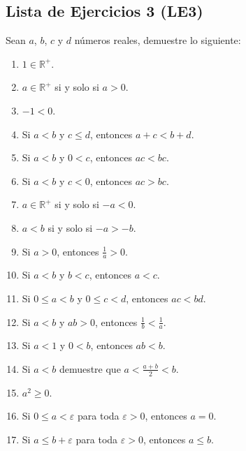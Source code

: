 \documentclass[11pt]{article}
\newcommand{\R}{\mathbb{R}}
\begin{document}
\subsection*{Lista de Ejercicios 3 (LE3)}
Sean $a$, $b$, $c$ y $d$ números reales, demuestre lo siguiente:%
%
\begin{enumerate}[label=\alph*)]
    \item $1 \in \R^+$.
    \item $a \in \R^+$ si y solo si $a>0$. %
    \item $-1<0$. %
    \item Si $a<b$ y $c \leq d$, entonces $a+c<b+d$. %
    \item Si $a<b$ y $0<c$, entonces $ac<bc$. %
    \item Si $a<b$ y $c<0$, entonces $ac>bc$. %
    \item $a \in \R^+$ si y solo si $-a<0$. %
    \item $a<b$ si y solo si $-a>-b$. %
    \item Si $a>0$, entonces $\frac{1}{a}>0$. %
    \item Si $a<b$ y $b<c$, entonces $a<c$. %
    \item Si $0 \leq a<b$ y $0 \leq c<d$, entonces $ac<bd$. %
    \item Si $a<b$ y $ab>0$, entonces $\frac{1}{b}<\frac{1}{a}$. %
    \item Si $a<1$ y $0<b$, entonces $ab<b$.
    \item Si $a<b$ demuestre que $a<\frac{a+b}{2}<b$.
    \item $a^2\geq 0$.
    \item Si $0 \leq a < \varepsilon$ para toda $\varepsilon > 0$, entonces $a=0$.
    \item Si $a \leq b + \varepsilon$ para toda $\varepsilon > 0$, entonces $a \leq b$.
\end{enumerate}
\end{document}
